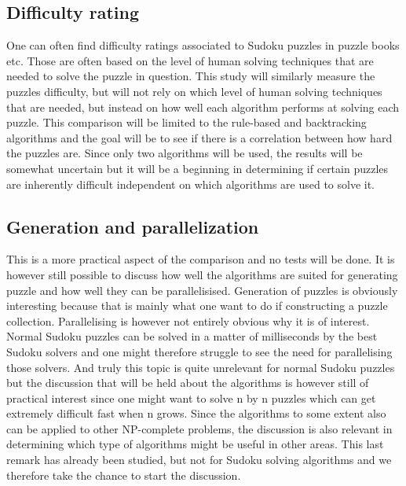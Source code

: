\documentclass[a4paper,11pt]{kth-mag}
\begin{document}
\subsection{Difficulty rating}
One can often find difficulty ratings associated to Sudoku puzzles in puzzle books etc. Those are often based on the level of human solving techniques that are needed to solve the puzzle in question. \cite{difficulty} 
This study will similarly measure the puzzles difficulty, but will not rely on which level of human solving techniques that are needed, but instead on how well each algorithm performs at solving each puzzle. 
This comparison will be limited to the rule-based and backtracking algorithms and the goal will be to see if there is a correlation between how hard the puzzles are. 
Since only two algorithms will be used, the results will be somewhat uncertain but it will be a beginning in determining if certain puzzles are inherently difficult independent on which algorithms are used to solve it.

\subsection{Generation and parallelization}
This is a more practical aspect of the comparison and no tests will be done. It is however still possible to discuss how well the algorithms are suited for generating puzzle and how well they can be parallelisised. Generation of puzzles is obviously interesting because that is mainly what one want to do if constructing a puzzle collection. Parallelising is however not entirely obvious why it is of interest. Normal Sudoku puzzles can be solved in a matter of milliseconds by the best Sudoku solvers and one might therefore struggle to see the need for parallelising those solvers. And truly this topic is quite unrelevant for normal Sudoku puzzles but the discussion that will be held about the algorithms is however still of practical interest since one might want to solve n by n puzzles which can get extremely difficult fast when n grows. Since the algorithms to some extent also can be applied to other NP-complete problems, the discussion is also relevant in determining which type of algorithms might be useful in other areas. This last remark has already been studied, but not for Sudoku solving algorithms and we therefore take the chance to start the discussion.
\end{document}
